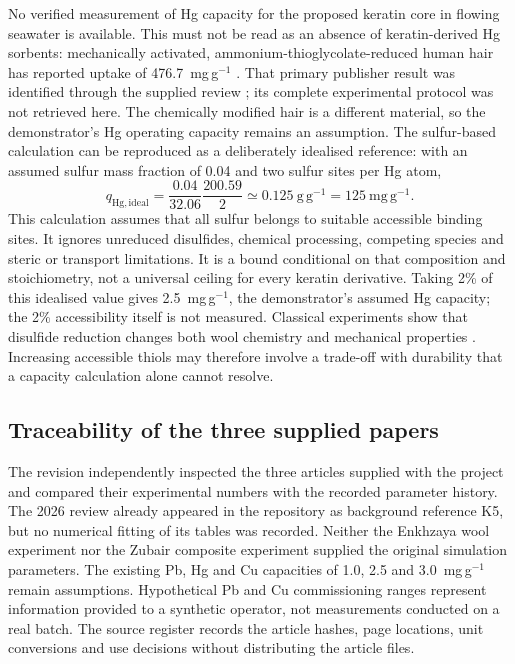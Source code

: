 No verified measurement of Hg capacity for the proposed keratin core in flowing seawater is available. This must not be read as an absence of keratin-derived Hg sorbents: mechanically activated, ammonium-thioglycolate-reduced human hair has reported uptake of 476.7~mg\,g$^{-1}$ \citep{liang2023}. That primary publisher result was identified through the supplied review \citep{zubair2026}; its complete experimental protocol was not retrieved here. The chemically modified hair is a different material, so the demonstrator's Hg operating capacity remains an assumption. The sulfur-based calculation can be reproduced as a deliberately idealised reference: with an assumed sulfur mass fraction of 0.04 and two sulfur sites per Hg atom,
\begin{equation}
q_{\mathrm{Hg,ideal}}=
\frac{0.04}{32.06}\frac{200.59}{2}
\simeq0.125\ \mathrm{g\,g^{-1}}
=125\ \mathrm{mg\,g^{-1}}.
\end{equation}
This calculation assumes that all sulfur belongs to suitable accessible binding sites. It ignores unreduced disulfides, chemical processing, competing species and steric or transport limitations. It is a bound conditional on that composition and stoichiometry, not a universal ceiling for every keratin derivative. Taking 2\% of this idealised value gives 2.5~mg\,g$^{-1}$, the demonstrator's assumed Hg capacity; the 2\% accessibility itself is not measured. Classical experiments show that disulfide reduction changes both wool chemistry and mechanical properties \citep{patterson1941}. Increasing accessible thiols may therefore involve a trade-off with durability that a capacity calculation alone cannot resolve.

\subsection{Traceability of the three supplied papers}
\label{sec:paper-traceability}

The revision independently inspected the three articles supplied with the project and compared their experimental numbers with the recorded parameter history. The 2026 review already appeared in the repository as background reference K5, but no numerical fitting of its tables was recorded. Neither the Enkhzaya wool experiment nor the Zubair composite experiment supplied the original simulation parameters. The existing Pb, Hg and Cu capacities of 1.0, 2.5 and 3.0~mg\,g$^{-1}$ remain assumptions. Hypothetical Pb and Cu commissioning ranges represent information provided to a synthetic operator, not measurements conducted on a real batch. The source register records the article hashes, page locations, unit conversions and use decisions without distributing the article files.

